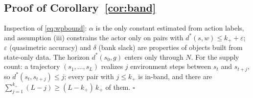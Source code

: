 \documentclass{article}
\theoremstyle{plain}
\theoremstyle{definition}
\begin{document}
\subsection{Proof of Corollary~\ref{cor:band}}
Inspection of \eqref{eq:wpbound}: $\alpha$ is the only constant estimated from action labels, and assumption (iii) constrains the actor only on pairs with $d^\ast(s,w)\le k_++\varepsilon$; $\varepsilon$ (quasimetric accuracy) and $\delta$ (bank slack) are properties of objects built from state-only data. The horizon $d^\ast(s_0,g)$ enters only through $N$. For the supply count: a trajectory $(s_1,\dots,s_L)$ realizes $j$ environment steps between $s_t$ and $s_{t+j}$, so $d^\ast(s_t,s_{t+j})\le j$; every pair with $j\le k_+$ is in-band, and there are $\sum_{j=1}^{k_+}(L-j)\ge(L-k_+)\,k_+$ of them. \hfill$\square$
\end{document}

